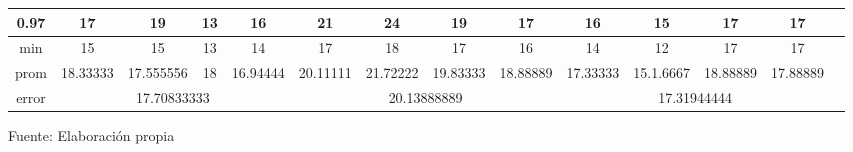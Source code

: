 \begin{center}
\begin{table}[H]
{\begin{tabular}{|c|c|c|c|c|c|c|c|c|c|c|c|c|c|}
\hline 
0.97 & 
17 & 19 & 13 & 16 & 21 & 24 & 19 & 17 & 16 & 15 & 17 & 17 \\
\hline 
min & 
15 & 15 & 13 & 14 & 17 & 18 & 17 & 16 & 14 & 12 & 17 & 17 \\
\hline 
prom & 
18.33333 & 17.555556 & 18 & 16.94444 & 20.11111 & 21.72222 & 19.83333 & 18.88889 & 17.33333 & 15.1.6667 & 18.88889 & 17.88889 \\
\hline 
error & 
\multicolumn{4}{c|}{17.70833333} & 
\multicolumn{4}{c|}{20.13888889} & 
\multicolumn{4}{c|}{17.31944444}\\ 
\hline 
\end{tabular} 
}
\begin{center}
\vskip 0.2cm
{\small{Fuente: Elaboración propia}}
\end{center}
\end{table}
\end{center}

